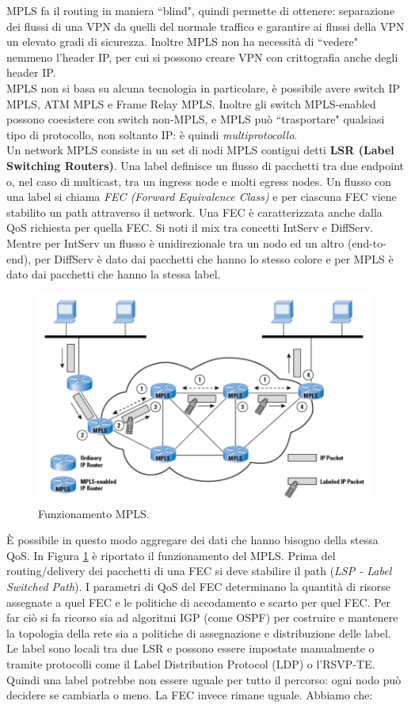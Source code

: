MPLS fa il routing in maniera \textquotedblleft blind", quindi permette di ottenere: separazione dei flussi di una VPN da quelli del normale traffico e garantire ai flussi della VPN un elevato gradi di sicurezza. Inoltre MPLS non ha necessità di \textquotedblleft vedere" nemmeno l'header IP, per cui si possono creare VPN con crittografia anche degli header IP.\\
MPLS non si basa su alcuna tecnologia in particolare, è possibile avere switch IP MPLS, ATM MPLS e Frame Relay MPLS. Inoltre gli switch MPLS-enabled possono coesistere con switch non-MPLS, e MPLS può \textquotedblleft trasportare" qualsiasi tipo di protocollo, non soltanto IP: è quindi \textit{multiprotocollo}.\\
Un network MPLS consiste in un set di nodi MPLS contigui detti \textbf{LSR (Label Switching Routers)}. Una label definisce un flusso di pacchetti tra due endpoint o, nel caso di multicast, tra un ingress node e molti egress nodes. Un flusso con una label si chiama \textit{FEC (Forward Equivalence Class)} e per ciascuna FEC viene stabilito un path attraverso il network. Una FEC è caratterizzata anche dalla QoS richiesta per quella FEC. Si noti il mix tra concetti IntServ e DiffServ. Mentre per IntServ un flusso è unidirezionale tra un nodo ed un altro (end-to-end), per DiffServ è dato dai pacchetti che hanno lo stesso colore e per MPLS è dato dai pacchetti che hanno la stessa label.
\begin{figure}[htbp]
	\centering
	\includegraphics[scale = 0.4]{images/MPLS}
	\caption{Funzionamento MPLS.}
	\label{img:MPLS}
\end{figure}
È possibile in questo modo aggregare dei dati che hanno bisogno della stessa QoS. In Figura \ref{img:MPLS} è riportato il funzionamento del MPLS. Prima del routing/delivery dei pacchetti di una FEC si deve stabilire il path (\textit{LSP - Label Switched Path}). I parametri di QoS del FEC determinano la quantità di risorse assegnate a quel FEC e le politiche di accodamento e scarto per quel FEC. Per far ciò si fa ricorso sia ad algoritmi IGP (come OSPF) per costruire e mantenere la topologia della rete sia a politiche di assegnazione e distribuzione delle label. Le label sono locali tra due LSR e possono essere impostate manualmente o tramite protocolli come il Label Distribution Protocol (LDP) o l'RSVP-TE. Quindi una label potrebbe non essere uguale per tutto il percorso: ogni nodo può decidere se cambiarla o meno. La FEC invece rimane uguale. Abbiamo che:
